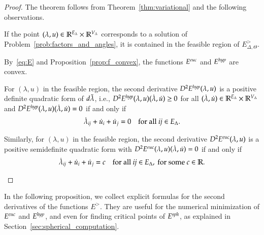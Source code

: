 \documentclass[Thesis]{subfiles}
\begin{document}
\begin{proof}
  The theorem follows from Theorem~\ref{thm:variational} and the
  following observations.
  
  \begin{compactenum}[(1)]
  \item If the point $(\lambda,
    u)\in\mathbb R^{E_{\Delta}}\times\mathbb R^{V_{\Delta}}$ corresponds to a
    solution of Problem~\ref{prob:factors_and_angles}, it is contained
    in the feasible region of $E^{\gt}_{\Delta,\Theta}$.


  \item By~\eqref{eq:E} and Proposition~\ref{prop:f_convex}, the
    functions $E^{\euc}$ and $E^{\mathit{hyp}}$ are convex.

  \item For $(\lambda, u)$ in the feasible region, the second
    derivative $D^{2}E^{\mathit{hyp}}(\lambda,u)$ is a positive definite
    quadratic form of $d\tilde{\lambda}$, i.e.,
    $D^{2}E^{\mathit{hyp}}(\lambda,u)(\dot\lambda,\dot u)\geq 0$ for all
    $(\dot\lambda,\dot u)\in\mathbb R^{E_{\Delta}}\times\mathbb R^{V_{\Delta}}$ and
    $D^{2}E^{\mathit{hyp}}(\lambda,u)(\dot\lambda,\dot u)=0$ if and only if
    \begin{equation*}
      \dot\lambda_{\it ij}+\dot u_{i}+\dot u_{j}=0
      \quad\text{for all }{\it ij}\in E_{\Delta}.
    \end{equation*}
    
  \item Similarly, for $(\lambda, u)$ in the feasible region, the
    second derivative $D^{2}E^{\euc}(\lambda,u)$ is a positive
    semidefinite quadratic form with
    $D^{2}E^{\euc}(\lambda,u)(\dot\lambda,\dot u)=0$ if and only if
    \begin{equation*}
      \dot\lambda_{\it ij}+\dot u_{i}+\dot u_{j}=c
      \quad\text{for all }{\it ij}\in E_{\Delta},
      \text{ for some } c\in\mathbb R.
    \end{equation*}
  \end{compactenum}
\end{proof}

In the following proposition, we collect explicit formulas for the
second derivatives of the functions $E^{\gt}$. They are useful for the
numerical minimization of $E^{\euc}$ and $E^{\mathit{hyp}}$, and even for
finding critical points of $E^{\mathit{sph}}$, as explained in
Section~\ref{sec:spherical_computation}.
\end{document}
